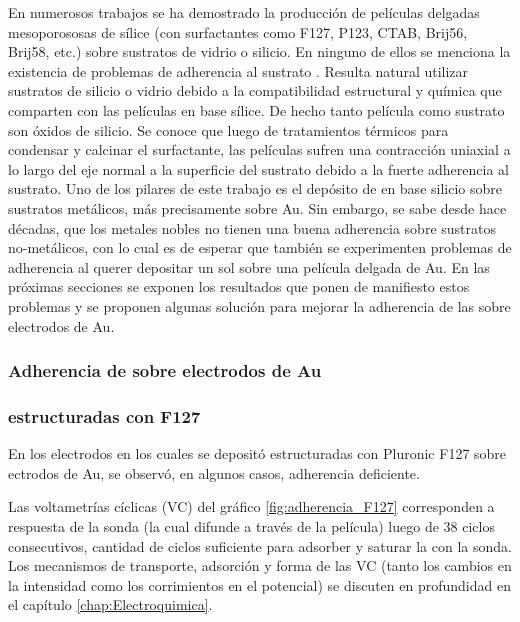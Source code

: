 		 En numerosos trabajos se ha demostrado la producción de películas delgadas mesoporososas de sílice (con surfactantes como F127, P123, CTAB, Brij56, Brij58, etc.) sobre sustratos de vidrio o silicio. En ninguno de ellos se menciona la existencia de problemas de adherencia al sustrato \cite{Angelome2008,Fuertes2010,Violi2015}. Resulta natural utilizar sustratos de silicio o vidrio debido a la compatibilidad estructural y química que comparten con las películas en base sílice. De hecho tanto película como sustrato son óxidos de silicio. Se conoce que luego de tratamientos térmicos para condensar y calcinar el surfactante, las películas sufren una contracción uniaxial a lo largo del eje normal a la superficie del sustrato debido a la fuerte adherencia al sustrato.\cite{Grosso2004,Soler-Illia2012,Chougnet2005} Uno de los pilares de este trabajo es el depósito de \pdm\space en base silicio sobre sustratos metálicos, más precisamente sobre Au. Sin embargo, se sabe desde hace décadas, que los metales nobles no tienen una buena adherencia sobre sustratos no-metálicos\cite{Kern1990,Hieber1976}, con lo cual es de esperar que también se experimenten problemas de adherencia al querer depositar un sol sobre una película delgada de Au. \cite{Meyer2004,Nugen2009,nasa1973} En las próximas secciones se exponen los resultados que ponen de manifiesto estos problemas y se proponen algunas solución para mejorar la adherencia de las \pdm\space sobre electrodos de Au.

		\subsubsection{Adherencia de \pdm\space sobre electrodos de Au}

			\subsubsection*{\pdm\space estructuradas con F127}

			En los electrodos en los cuales se depositó \pdm\space estructuradas con Pluronic F127 sobre ectrodos de Au, se observó, en algunos casos, adherencia deficiente. 
			
			Las voltametrías cíclicas (VC) del gráfico \ref{fig:adherencia_F127} corresponden a respuesta de la sonda \aminorutenio (la cual difunde a través de la película) luego de 38 ciclos consecutivos, cantidad de ciclos suficiente para adsorber y saturar la \pdm\space con la sonda. Los mecanismos de transporte, adsorción y forma de las VC (tanto los cambios en la intensidad como los corrimientos en el potencial) se discuten en profundidad en el capítulo \ref{chap:Electroquimica}. 
			
